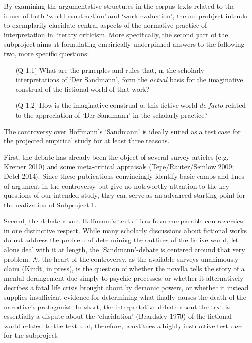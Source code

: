 By examining the argumentative structures in the corpus-texts related to the issues of both `world construction' and `work evaluation', the subprobject intends to exemplarily elucidate central aspects of the normative practice of interpretation in literary criticism. More specifically, the second part of the subproject aims at formulating empirically underpinned answers to the following two, more specific questions:

\vspace{-.1cm}
\begin{itemize}[leftmargin=2cm]
\item[(Q 1.1)] What are the principles and rules that, in the scholarly interpretations of `Der Sandmann', form the \emph{actual} basis for the imaginative construal of the fictional world of that work?
\end{itemize}
\vspace{-.1cm}

\vspace{-.1cm}
\begin{itemize}[leftmargin=2cm]
\item[(Q 1.2)] How is the imaginative construal of this fictive world \emph{de facto} related to the appreciation of `Der Sandmann' in the scholarly practice?
\end{itemize}
\vspace{-.1cm}

\noindent The controversy over Hoffmann's `Sandmann' is ideally suited as a test case for the projected empirical study for at least three reasons. 

First, the debate has already been the object of several survey articles (e.g. Kremer 2010) and some meta-critical appraisals (Tepe/Rauter/Semlow 2009; Detel 2014). Since these publications convincingly identify basic camps and lines of argument in the controversy but give no noteworthy attention to the key questions of our intended study, they can serve as an advanced starting point for the realization of Subproject 1. 

Second, the debate about Hoffmann's text differs from comparable controversies in one distinctive respect. While many scholarly discussions about fictional works do not address the problem of determining the outlines of the fictive world, let alone deal with it at length, the `Sandmann'-debate is centered around that very problem. At the heart of the controversy, as the available surveys unanimously claim (Kindt, in press), is the question of whether the novella tells the story of a mental derangement due simply to psychic processes, or whether it alternatively decribes a fatal life crisis brought about by demonic powers, or whether it instead supplies insufficient evidence for determining what finally causes the death of the narrative's protagonist. In short, the interpretative debate about the text is essentially a dispute about the `elucidation' (Beardsley 1970) of the fictional world related to the text and, therefore, constitues a highly instructive test case for the subproject. 

